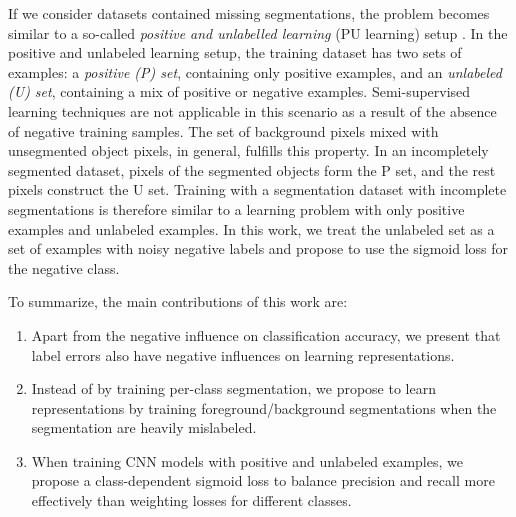 If we consider datasets contained missing segmentations, the problem becomes similar to a so-called \textit{positive and unlabelled learning} (PU learning) setup \cite{li2005learning}.
In the positive and unlabeled learning setup, the training dataset has two sets of examples: a \textit{positive (P) set}, containing only positive examples, and an \textit{unlabeled (U) set}, containing a mix of positive or negative examples.
Semi-supervised learning techniques are not applicable in this scenario as a result of the absence of negative training samples.
The set of background pixels mixed with unsegmented object pixels, in general, fulfills this property.
In an incompletely segmented dataset, pixels of the segmented objects form the P set, and the rest pixels construct the U set.
Training with a segmentation dataset with incomplete segmentations is therefore similar to a learning problem with only positive examples and unlabeled examples.
In this work, we treat the unlabeled set as a set of examples with noisy negative labels and propose to use the sigmoid loss for the negative class.




To summarize, the main contributions of this work are:
\begin{enumerate}
  \item Apart from the negative influence on classification accuracy, we present that label errors also have negative influences on learning representations.
  \item Instead of by training per-class segmentation, we propose to learn representations by training foreground/background segmentations when the segmentation are heavily mislabeled.
  \item When training CNN models with positive and unlabeled examples, we propose a class-dependent sigmoid loss to balance precision and recall more effectively than weighting losses for different classes.
\end{enumerate}


